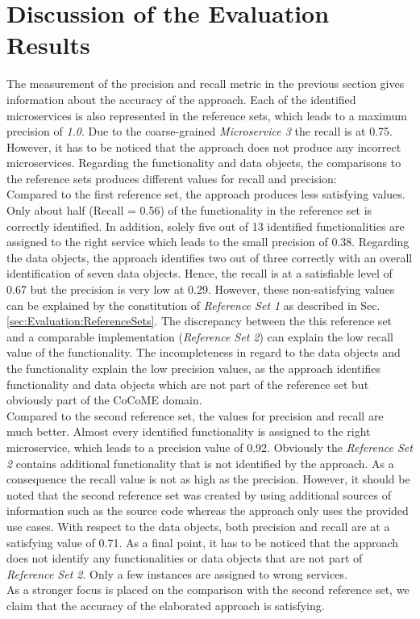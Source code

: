 \section{Discussion of the Evaluation Results}
\label{sec:Evalutation:Results}
The measurement of the precision and recall metric in the previous section gives information about the accuracy of the approach. Each of the identified microservices is also represented in the reference sets, which leads to a maximum precision of \textit{1.0}. Due to the coarse-grained \textit{Microservice 3} the recall is at 0.75. However, it has to be noticed that the approach does not produce any incorrect microservices. Regarding the functionality and data objects, the comparisons to the reference sets produces different values for recall and precision:\\

\noindent
Compared to the first reference set, the approach produces less 
satisfying values. Only about half (Recall = 0.56) of the functionality in the reference set is correctly identified.  In addition, solely five out of 13 identified functionalities are assigned to the right service which leads to the small precision of 0.38. Regarding the data objects, the approach identifies two out of three correctly with an overall identification of seven data objects. Hence, the recall is at a satisfiable level of 0.67 but the precision is very low at 0.29. However, these non-satisfying values can be explained by the constitution of \textit{Reference Set 1} as described in Sec.\ref{sec:Evaluation:ReferenceSets}. The discrepancy between the this reference set and a comparable implementation (\textit{Reference Set 2}) can explain the low recall value of the functionality. The incompleteness in regard to the data objects and the functionality explain the low precision values, as the approach identifies functionality and data objects which are not part of the reference set but obviously part of the CoCoME domain.\\

\noindent
Compared to the second reference set, the values for precision and recall are much better. Almost every identified functionality is assigned to the right microservice, which leads to a precision value of 0.92. Obviously the \textit{Reference Set 2} contains additional functionality that is not identified by the approach. As a consequence the recall value is not as high as the precision. However, it should be noted that the second reference set was created by using additional sources of information such as the source code whereas the approach only uses the provided use cases. With respect to the data objects, both precision and recall are at a satisfying value of 0.71. As a final point, it has to be noticed that the approach does not identify any functionalities or data objects that are not part of \textit{Reference Set 2}. Only a few instances are assigned to wrong services. \\
As a stronger focus is placed on the comparison with the second reference set, we claim that the accuracy of the elaborated approach is satisfying.
 






